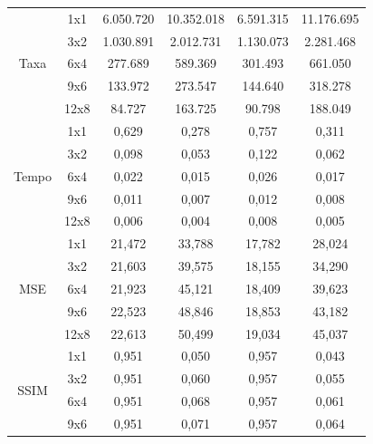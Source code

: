 \begin{longtable}{|c|c|c|c|c|c|}
    \multirow{5}{*}{Taxa}  & 1x1  & 6.050.720 & 10.352.018 & 6.591.315 & 11.176.695 \\ \cline{2-6}
                            & 3x2  & 1.030.891 & 2.012.731  & 1.130.073 & 2.281.468 \\ \cline{2-6}
                            & 6x4  & 277.689   & 589.369    & 301.493   & 661.050  \\  \cline{2-6}
                            & 9x6  & 133.972   & 273.547    & 144.640   & 318.278  \\  \cline{2-6}
                            & 12x8 & 84.727    & 163.725    & 90.798    & 188.049  \\   \hline
    \multirow{5}{*}{Tempo} & 1x1  & 0,629     & 0,278      & 0,757     & 0,311     \\  \cline{2-6}
                            & 3x2  & 0,098     & 0,053      & 0,122     & 0,062    \\  \cline{2-6}
                            & 6x4  & 0,022     & 0,015      & 0,026     & 0,017    \\  \cline{2-6}
                            & 9x6  & 0,011     & 0,007      & 0,012     & 0,008    \\  \cline{2-6}
                            & 12x8 & 0,006     & 0,004      & 0,008     & 0,005    \\  \hline 
    \multirow{5}{*}{MSE}   & 1x1  & 21,472    & 33,788     & 17,782    & 28,024    \\  \cline{2-6}          
                            & 3x2  & 21,603    & 39,575     & 18,155    & 34,290   \\  \cline{2-6}
                            & 6x4  & 21,923    & 45,121     & 18,409    & 39,623   \\  \cline{2-6}
                            & 9x6  & 22,523    & 48,846     & 18,853    & 43,182   \\  \cline{2-6}
                            & 12x8 & 22,613    & 50,499     & 19,034    & 45,037   \\  \hline 
    \multirow{5}{*}{SSIM}  & 1x1  & 0,951     & 0,050      & 0,957     & 0,043     \\  \cline{2-6}
                            & 3x2  & 0,951     & 0,060      & 0,957     & 0,055    \\  \cline{2-6}
                            & 6x4  & 0,951     & 0,068      & 0,957     & 0,061    \\  \cline{2-6}
                            & 9x6  & 0,951     & 0,071      & 0,957     & 0,064    \\  \cline{2-6}

\end{longtable}
